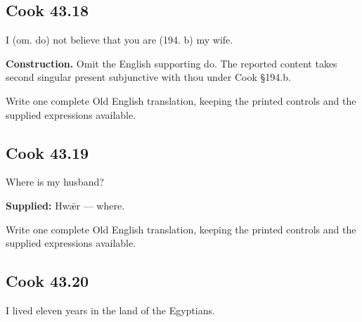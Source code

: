 \par\begin{minipage}{\linewidth}\raggedright
\subsection*{Cook 43.18}

I (om. do) not believe that you are (194. b) my wife.

\textbf{Construction.} Omit the English supporting do. The reported content takes second singular present subjunctive with thou under Cook §194.b.

Write one complete Old English translation, keeping the printed controls and the supplied expressions available.

\end{minipage}\par\addvspace{4pt}

\par\begin{minipage}{\linewidth}\raggedright
\subsection*{Cook 43.19}

Where is my husband?

\textbf{Supplied:} Hwǣr — where.

Write one complete Old English translation, keeping the printed controls and the supplied expressions available.

\end{minipage}\par\addvspace{4pt}

\par\begin{minipage}{\linewidth}\raggedright
\subsection*{Cook 43.20}

I lived eleven years in the land of the Egyptians.

\end{minipage}\par\addvspace{4pt}

